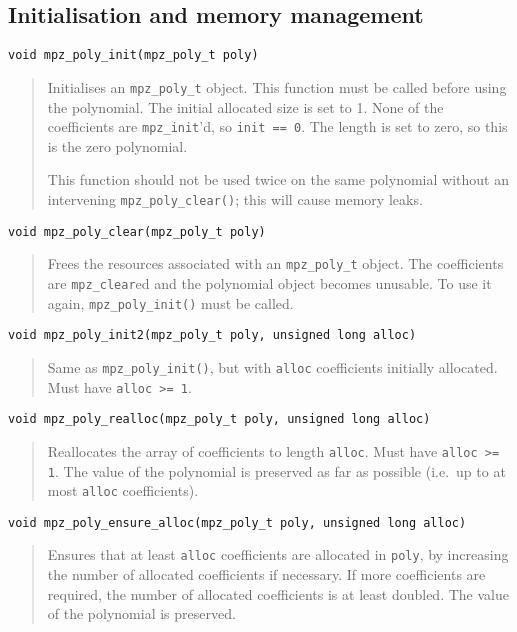 \documentclass[a4paper,10pt]{article}
\newcommand{\code}{\lstinline}
\begin{document}
\subsection{Initialisation and memory management}

\begin{lstlisting}
void mpz_poly_init(mpz_poly_t poly)
\end{lstlisting}
\begin{quote}
Initialises an \code{mpz_poly_t} object. This function must be called before using the polynomial. The initial allocated size is set to 1. None of the coefficients are \code{mpz_init}'d, so \code{init == 0}. The length is set to zero, so this is the zero polynomial. 

This function should not be used twice on the same polynomial without an intervening \code{mpz_poly_clear()}; this will cause memory leaks.
\end{quote}

\begin{lstlisting}
void mpz_poly_clear(mpz_poly_t poly)
\end{lstlisting}
\begin{quote}
Frees the resources associated with an \code{mpz_poly_t} object. The coefficients are \code{mpz_clear}ed and the polynomial object becomes unusable. To use it again, \code{mpz_poly_init()} must be called.
\end{quote}

\begin{lstlisting}
void mpz_poly_init2(mpz_poly_t poly, unsigned long alloc)
\end{lstlisting}
\begin{quote}
Same as \code{mpz_poly_init()}, but with \code{alloc} coefficients initially allocated. Must have \code{alloc >= 1}.
\end{quote}

\begin{lstlisting}
void mpz_poly_realloc(mpz_poly_t poly, unsigned long alloc)
\end{lstlisting}
\begin{quote}
Reallocates the array of coefficients to length \code{alloc}. Must have \code{alloc >= 1}. The value of the polynomial is preserved as far as possible (i.e.~up to at most \code{alloc} coefficients).
\end{quote}

\begin{lstlisting}
void mpz_poly_ensure_alloc(mpz_poly_t poly, unsigned long alloc)
\end{lstlisting}
\begin{quote}
Ensures that at least \code{alloc} coefficients are allocated in \code{poly}, by increasing the number of allocated coefficients if necessary. If more coefficients are required, the number of allocated coefficients is at least doubled. The value of the polynomial is preserved.
\end{quote}
\end{document}
